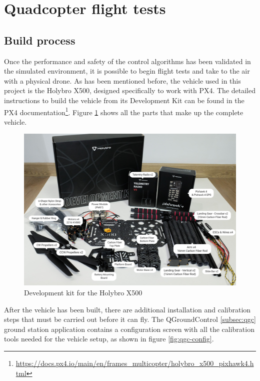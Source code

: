 \section{Quadcopter flight tests}


\subsection{Build process}
\label{sec:test-7-builddrone}


Once the performance and safety of the control algorithms has been validated in the simulated environment, it is possible to begin flight tests and take to the air with a physical drone.
As has been mentioned before, the vehicle used in this project is the Holybro X500, designed specifically to work with PX4.
The detailed instructions to build the vehicle from its Development Kit can be found in the PX4 documentation\footnote{\url{https://docs.px4.io/main/en/frames_multicopter/holybro_x500_pixhawk4.html}}.
Figure \ref{fig:x500-dev-kit} shows all the parts that make up the complete vehicle.

\begin{figure}
  \centering
  \includegraphics[width=.6\textwidth, keepaspectratio]{img/x500-dev-kit.jpg}
  \caption{Development kit for the Holybro X500}\label{fig:x500-dev-kit}
\end{figure}

After the vehicle has been built, there are additional installation and calibration steps that must be carried out before it can fly.
The QGroundControl \ref{subsec:qgc} ground station application contains a configuration screen with all the calibration tools needed for the vehicle setup, as shown in figure \ref{fig:qgc-config}.

